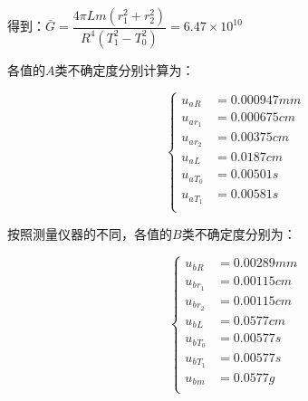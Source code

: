 \documentclass[a4paper]{ltxdoc}
\begin{document}
\begin{multicols}{2}
  得到：$\bar G = \dfrac{4\pi Lm(r_1^2+r_2^2)}{R^4(T_1^2-T_0^2)} = 6.47 \times 10^{10}$




  各值的$A$类不确定度分别计算为：

  \begin{equation}
    \left\{
    \begin{aligned}
      u_a{_{R}  } & = 0.000947 mm \\
      u_a{_{r_1}} & = 0.000675 cm \\
      u_a{_{r_2}} & = 0.00375 cm  \\
      u_a{_{L}  } & = 0.0187 cm   \\
      u_a{_{T_0}} & = 0.00501 s   \\
      u_a{_{T_1}} & = 0.00581 s   \\
    \end{aligned}
    \right.
    \label{A}
  \end{equation}

  按照测量仪器的不同，各值的$B$类不确定度分别为：

  \begin{equation}
    \left\{
    \begin{aligned}
      u_b{_{R}  } & = 0.00289 mm \\
      u_b{_{r_1}} & = 0.00115 cm \\
      u_b{_{r_2}} & = 0.00115 cm \\
      u_b{_{L}  } & = 0.0577 cm  \\
      u_b{_{T_0}} & = 0.00577 s  \\
      u_b{_{T_1}} & = 0.00577 s  \\
      u_b{_{m}  } & = 0.0577 g   \\
    \end{aligned}
    \right.
    \label{B}
  \end{equation}


\end{multicols}
\end{document}
